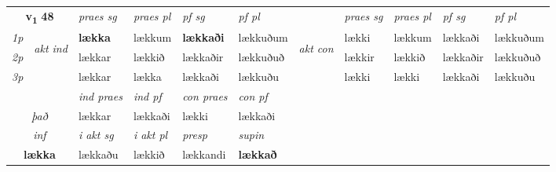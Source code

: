 \noindent
\begin{tabular}{lllllllllll} \toprule
\multicolumn{2}{c}{\textbf{v{\textsubscript{1}}} \Large{\textbf{48}}}  &  \textit{praes sg}  & \textit{praes pl}  &\textit{ pf sg} & \textit{pf pl} &  &  \textit{praes sg}  & \textit{praes pl}  & \textit{pf sg} & \textit{pf pl } \\*
	\cmidrule{3-6} \cmidrule{8-11}
 {\textit{1p}} & \multirow{3}{*}{\begin{turn}{90}\textit{akt ind}\end{turn}} & \textbf{lækka} & lækkum & \textbf{lækkaði} & lækkuðum & \multirow{3}{*}{\begin{turn}{90}\textit{akt con}\end{turn}} &lækki & lækkum & lækkaði & lækkuðum\\*
 {\textit{2p}} &  &  lækkar  & lækkið & lækkaðir & lækkuðuð & & lækkir & lækkið & lækkaðir & lækkuðuð \\*
{\textit{3p}} &  & lækkar & lækka & lækkaði & lækkuðu & & lækki & lækki& lækkaði & lækkuðu \\*
\cmidrule{3-6} \cmidrule{8-11}

   & &  \textit{ind praes} & \textit{ind pf} & \textit{con praes} & \textit{con pf} \\*
\multicolumn{2}{c}{ \textit{það} } & lækkar & lækkaði & lækki & lækkaði \\*

\cmidrule{3-6}
   \multicolumn{2}{c}{\textit{inf}}  & \textit{i akt sg} & \textit{i akt pl}   & \textit{presp} & \textit{supin}   \\*
  \multicolumn{2}{c}{\textbf{lækka}} & lækkaðu  & lækkið   & lækkandi &  \textbf{lækkað}   \\*
\end{tabular}

